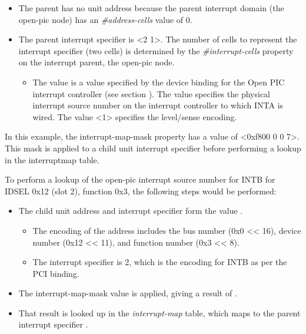 \documentclass[a4paper,10pt,oneside]{sphinxmanual}
\begin{document}
\begin{itemize}
\begin{itemize}
\item {} 
The parent has no unit address because the parent interrupt domain
(the open-pic node) has an \emph{\#address-cells} value of 0.

\item {} 
The parent interrupt specifier is \textless{}2 1\textgreater{}. The number of cells to
represent the interrupt specifier (two cells) is determined by the
\emph{\#interrupt-cells} property on the interrupt parent, the open-pic
node.
\begin{itemize}
\item {} 
The value  is a value specified by the device binding for
the Open PIC interrupt controller (see section
{\hyperref[device\string-bindings:sect\string-bindings\string-simple\string-bus]{}}). The value \code{\textless{}2\textgreater{}} specifies the
physical interrupt source number on the interrupt controller to
which INTA is wired. The value \textless{}1\textgreater{} specifies the level/sense
encoding.

\end{itemize}

\end{itemize}

\end{itemize}

In this example, the interrupt-map-mask property has a value of \textless{}0xf800
0 0 7\textgreater{}. This mask is applied to a child unit interrupt specifier before
performing a lookup in the interruptmap table.

To perform a lookup of the open-pic interrupt source number for INTB for
IDSEL 0x12 (slot 2), function 0x3, the following steps would be
performed:
\begin{itemize}
\item {} 
The child unit address and interrupt specifier form the value
.
\begin{itemize}
\item {} 
The encoding of the address includes the bus number (0x0 \textless{}\textless{} 16),
device number (0x12 \textless{}\textless{} 11), and function number (0x3 \textless{}\textless{} 8).

\item {} 
The interrupt specifier is 2, which is the encoding for INTB as
per the PCI binding.

\end{itemize}

\item {} 
The interrupt-map-mask value  is applied, giving a
result of .

\item {} 
That result is looked up in the \emph{interrupt-map} table, which maps to
the parent interrupt specifier .

\end{itemize}
\end{document}
